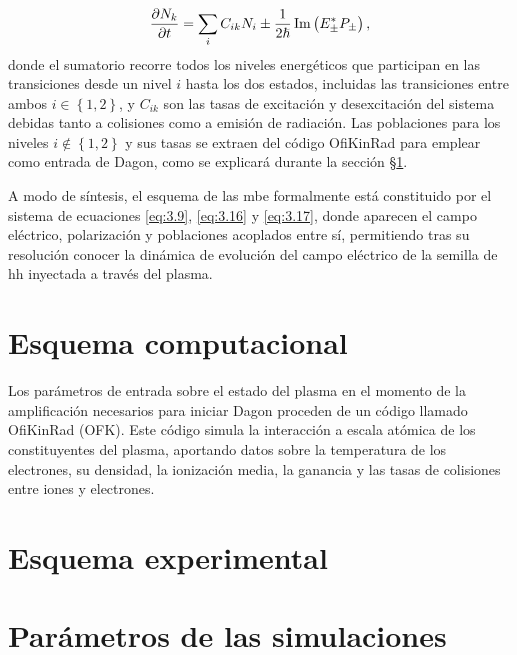 \begin{equation}\label{eq:3.17}
  \frac{\partial N_{k}}{\partial t} = \sum_{i} C_{ik}N_{i} \pm \frac{1}{2 \hslash }\operatorname{Im} \left(E_{\pm }^{*}P_{\pm }\right),
\end{equation}
donde el sumatorio recorre todos los niveles energéticos que participan en las transiciones desde un nivel $i$ hasta los dos estados, incluidas las transiciones entre ambos $i \in \left\{1, 2\right\}$, y $C_{ik}$ son las tasas de excitación y desexcitación del sistema debidas tanto a colisiones como a emisión de radiación. Las poblaciones para los niveles $i \notin \left\{1,2\right\}$ y sus tasas se extraen del código OfiKinRad para emplear como entrada de Dagon, como se explicará durante la sección \S\ref{sec:3.2}.

A modo de síntesis, el esquema de las \acrshort{mbe} formalmente está constituido por el sistema de ecuaciones \eqref{eq:3.9}, \eqref{eq:3.16} y \eqref{eq:3.17}, donde aparecen el campo eléctrico, polarización y poblaciones acoplados entre sí, permitiendo tras su resolución conocer la dinámica de evolución del campo eléctrico de la semilla de \acrshort{hh} inyectada a través del plasma.

\section{Esquema computacional}\label{sec:3.2}
Los parámetros de entrada sobre el estado del plasma en el momento de la amplificación necesarios para iniciar Dagon proceden de un código llamado OfiKinRad (OFK). Este código simula la interacción a escala atómica de los constituyentes del plasma, aportando datos sobre la temperatura de los electrones, su densidad, la ionización media, la ganancia y las tasas de colisiones entre iones y electrones.

\section{Esquema experimental}\label{sec:3.3}

\section{Parámetros de las simulaciones}\label{sec:3.4}
